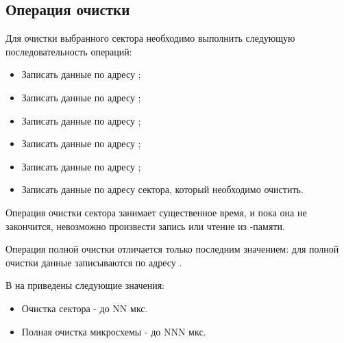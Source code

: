\subsection{Операция очистки}
\par{Для очистки выбранного сектора необходимо выполнить следующую последовательность операций:
\begin{itemize}[noitemsep, label={}]
  \item Записать данные  по адресу ;
  \item Записать данные  по адресу ;
  \item Записать данные  по адресу ;
  \item Записать данные  по адресу ;
  \item Записать данные  по адресу ;
  \item Записать данные  по адресу сектора, который необходимо очистить.
\end{itemize}}
\par{Операция очистки сектора занимает существенное время, и пока она не закончится, невозможно произвести запись или чтение из -памяти.}
\par{Операция полной очистки отличается только последним значением: для полной очистки данные  записываются по адресу .}
\par{В  на  приведены следующие значения:
\begin{itemize}[noitemsep, label={}]
  \item Очистка сектора - до NN мкс.
  \item Полная очистка микросхемы - до NNN мкс.
\end{itemize}}


